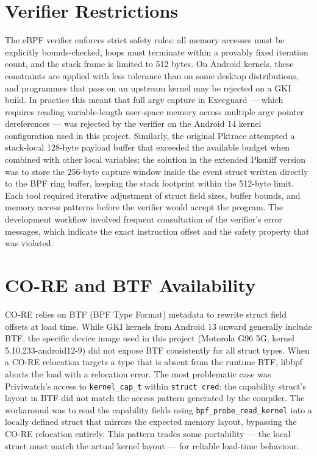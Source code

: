 \documentclass{mnitjaipur}
\begin{document}
\section{Verifier Restrictions}
The eBPF verifier enforces strict safety rules: all memory accesses must be explicitly bounds-checked, loops must terminate within a provably fixed iteration count, and the stack frame is limited to 512 bytes. On Android kernels, these constraints are applied with less tolerance than on some desktop distributions, and programmes that pass on an upstream kernel may be rejected on a GKI build. In practice this meant that full argv capture in Execguard — which requires reading variable-length user-space memory across multiple argv pointer dereferences — was rejected by the verifier on the Android 14 kernel configuration used in this project. Similarly, the original Pktrace attempted a stack-local 128-byte payload buffer that exceeded the available budget when combined with other local variables; the solution in the extended Pksniff version was to store the 256-byte capture window inside the event struct written directly to the BPF ring buffer, keeping the stack footprint within the 512-byte limit. Each tool required iterative adjustment of struct field sizes, buffer bounds, and memory access patterns before the verifier would accept the program. The development workflow involved frequent consultation of the verifier's error messages, which indicate the exact instruction offset and the safety property that was violated.

\section{CO-RE and BTF Availability}
CO-RE relies on BTF (BPF Type Format) metadata to rewrite struct field offsets at load time. While GKI kernels from Android 13 onward generally include BTF, the specific device image used in this project (Motorola G96 5G, kernel 5.10.233-android12-9) did not expose BTF consistently for all struct types. When a CO-RE relocation targets a type that is absent from the runtime BTF, libbpf aborts the load with a relocation error. The most problematic case was Priviwatch's access to \texttt{kernel\_cap\_t} within \texttt{struct cred}: the capability struct's layout in BTF did not match the access pattern generated by the compiler. The workaround was to read the capability fields using \texttt{bpf\_probe\_read\_kernel} into a locally defined struct that mirrors the expected memory layout, bypassing the CO-RE relocation entirely. This pattern trades some portability — the local struct must match the actual kernel layout — for reliable load-time behaviour.
\end{document}
